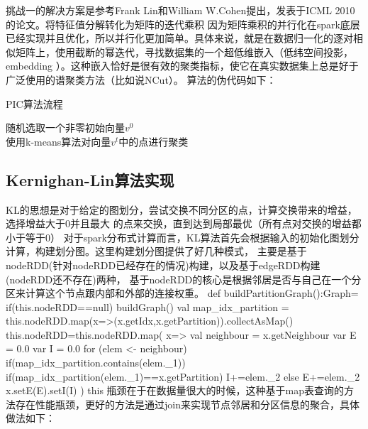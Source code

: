挑战一的解决方案是参考Frank Lin和William W.Cohen提出，发表于ICML 2010的论文。将特征值分解转化为矩阵的迭代乘积
因为矩阵乘积的并行化在spark底层已经实现并且优化，所以并行化更加简单。具体来说，就是在数据归一化的逐对相似矩阵上，使用截断的幂迭代，寻找数据集的一个超低维嵌入（低纬空间投影，embedding ）。这种嵌入恰好是很有效的聚类指标，使它在真实数据集上总是好于广泛使用的谱聚类方法（比如说NCut）。
算法的伪代码如下：
\begin{algorithm}[htbp]
\caption{PIC算法流程}
\SetAlgoLined
{}
随机选取一个非零初始向量$v^0$ \\
使用k-means算法对向量$v^t$中的点进行聚类
\end{algorithm}



\subsection{Kernighan-Lin算法实现}

KL的思想是对于给定的图划分，尝试交换不同分区的点，计算交换带来的增益，选择增益大于0并且最大
的点来交换，直到达到局部最优（所有点对交换的增益都小于等于0）
对于spark分布式计算而言，KL算法首先会根据输入的初始化图划分计算，构建划分图。这里构建划分图提供了好几种模式，
主要是基于nodeRDD(针对nodeRDD已经存在的情况)构建，以及基于edgeRDD构建(nodeRDD还不存在)两种，
基于nodeRDD的核心是根据邻居是否与自己在一个分区来计算这个节点跟内部和外部的连接权重。
def buildPartitionGraph():Graph={
        if(this.nodeRDD==null) buildGraph()
        val map_idx_partition = this.nodeRDD.map(x=>(x.getIdx,x.getPartition)).collectAsMap()
        this.nodeRDD=this.nodeRDD.map(
            x=>{
                val neighbour = x.getNeighbour
                var E = 0.0
                var I = 0.0
                for (elem <- neighbour) {
                    if(map_idx_partition.contains(elem._1)){
                        if(map_idx_partition(elem._1)==x.getPartition)
                            I+=elem._2
                        else
                            E+=elem._2
                    }
                }
                x.setE(E).setI(I)
            }
        )
        this
    }
瓶颈在于在数据量很大的时候，这种基于map表查询的方法存在性能瓶颈，更好的方法是通过join来实现节点邻居和分区信息的聚合，具体做法如下：

